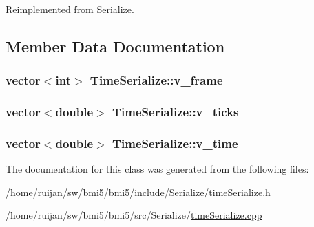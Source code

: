 Reimplemented from \hyperlink{classSerialize_ac94a76de6c9376e33b4c195d50ff0568}{Serialize}.



\subsection{Member Data Documentation}
\hypertarget{classTimeSerialize_ae215c04e400b72cc80d3e91552335dee}{
\subsubsection[{v\-\_\-frame}]{\setlength{\rightskip}{0pt plus 5cm}vector$<$int$>$ Time\-Serialize\-::v\-\_\-frame}}\label{classTimeSerialize_ae215c04e400b72cc80d3e91552335dee}
\hypertarget{classTimeSerialize_affc36f2cdf92fd934e8c77fe15954ec9}{
\subsubsection[{v\-\_\-ticks}]{\setlength{\rightskip}{0pt plus 5cm}vector$<$double$>$ Time\-Serialize\-::v\-\_\-ticks}}\label{classTimeSerialize_affc36f2cdf92fd934e8c77fe15954ec9}
\hypertarget{classTimeSerialize_acc179754062d5bee1d77a19ecbc948d6}{
\subsubsection[{v\-\_\-time}]{\setlength{\rightskip}{0pt plus 5cm}vector$<$double$>$ Time\-Serialize\-::v\-\_\-time}}\label{classTimeSerialize_acc179754062d5bee1d77a19ecbc948d6}


The documentation for this class was generated from the following files\-:\begin{DoxyCompactItemize}
\item 
/home/ruijan/sw/bmi5/bmi5/include/\-Serialize/\hyperlink{timeSerialize_8h}{time\-Serialize.\-h}\item 
/home/ruijan/sw/bmi5/bmi5/src/\-Serialize/\hyperlink{timeSerialize_8cpp}{time\-Serialize.\-cpp}\end{DoxyCompactItemize}
